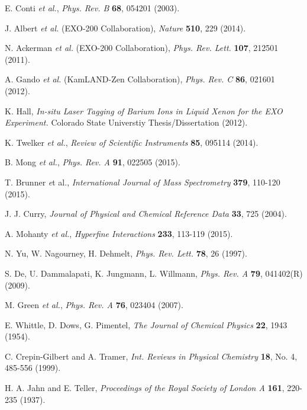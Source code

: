 \documentclass[PhD, copyrightpage]{csuthesis} %
\begin{document}
\begin{thebibliography}{00}
  E. Conti \emph{et al.}, \emph{Phys. Rev. B} \textbf{68}, 054201 (2003).
 
  J. Albert \emph{et al.} (EXO-200 Collaboration), \emph{Nature} \textbf{510}, 229 (2014).
 
  N. Ackerman \emph{et al.} (EXO-200 Collaboration), \emph{Phys. Rev. Lett.} \textbf{107}, 212501 (2011).
 
  A. Gando \emph{et al.} (KamLAND-Zen Collaboration), \emph{Phys. Rev. C} \textbf{86}, 021601 (2012).
 
  K. Hall, \emph{In-situ Laser Tagging of Barium Ions in Liquid Xenon for the EXO Experiment.}  Colorado State Universtiy Thesis/Dissertation (2012).
 
  K. Twelker \emph{et al.}, \emph{Review of Scientific Instruments} \textbf{85}, 095114 (2014).
 
  B. Mong \emph{et al.}, \emph{Phys. Rev. A} \textbf{91}, 022505 (2015).
 
  T. Brunner \emph et al., \emph{International Journal of Mass Spectrometry} \textbf{379}, 110-120 (2015).
 
 
  J. J. Curry, \emph{Journal of Physical and Chemical Reference Data} \textbf{33}, 725 (2004).
 
 
  A. Mohanty \emph{et al.}, \emph{Hyperfine Interactions} \textbf{233}, 113-119 (2015).
 
  N. Yu, W. Nagourney, H. Dehmelt, \emph{Phys. Rev. Lett.} \textbf{78}, 26 (1997).
 
  S. De, U. Dammalapati, K. Jungmann, L. Willmann, \emph{Phys. Rev. A} \textbf{79}, 041402(R) (2009).
 
  M. Green \emph{et al.}, \emph{Phys. Rev. A} \textbf{76}, 023404 (2007).
 
  E. Whittle, D. Dows, G. Pimentel, \emph{The Journal of Chemical Physics} \textbf{22}, 1943 (1954).
 
  C. Crepin-Gilbert and A. Tramer, \emph{Int. Reviews in Physical Chemistry} \textbf{18}, No. 4, 485-556 (1999).
 
  H. A. Jahn and E. Teller, \emph{Proceedings of the Royal Society of London A} \textbf{161}, 220-235 (1937).
 

\end{thebibliography}
\end{document}
